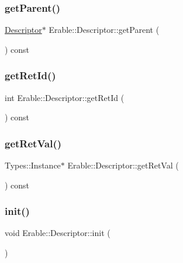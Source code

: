 \subsubsection{\texorpdfstring{getParent()}{getParent()}}
{\footnotesize\ttfamily \mbox{\hyperlink{class_erable_1_1_descriptor}{Descriptor}}$\ast$ Erable\+::\+Descriptor\+::get\+Parent (\begin{DoxyParamCaption}{ }\end{DoxyParamCaption}) const\hspace{0.3cm}{\ttfamily [inline]}}

\mbox{\label{class_erable_1_1_descriptor_a735e3ee95355237de05da52dea59e381}} 
\subsubsection{\texorpdfstring{getRetId()}{getRetId()}}
{\footnotesize\ttfamily int Erable\+::\+Descriptor\+::get\+Ret\+Id (\begin{DoxyParamCaption}{ }\end{DoxyParamCaption}) const\hspace{0.3cm}{\ttfamily [inline]}}

\mbox{\label{class_erable_1_1_descriptor_abee030b1b047c6b81c497ae2211c5320}} 
\subsubsection{\texorpdfstring{getRetVal()}{getRetVal()}}
{\footnotesize\ttfamily Types\+::\+Instance$\ast$ Erable\+::\+Descriptor\+::get\+Ret\+Val (\begin{DoxyParamCaption}{ }\end{DoxyParamCaption}) const\hspace{0.3cm}{\ttfamily [inline]}}

\mbox{\label{class_erable_1_1_descriptor_a069b8d3315849b50e2f094f90489252b}} 
\subsubsection{\texorpdfstring{init()}{init()}}
{\footnotesize\ttfamily void Erable\+::\+Descriptor\+::init (\begin{DoxyParamCaption}{ }\end{DoxyParamCaption})\hspace{0.3cm}{\ttfamily [inline]}}

